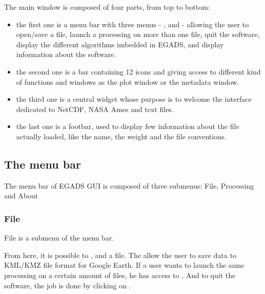 \documentclass[a4paper,10pt,openany,english]{sphinxmanual}
\let\sphinxpxdimen\pdfpxdimen\else\newdimen\sphinxpxdimen
\begin{document}
The main window is composed of four parts, from top to bottom:
\begin{itemize}
\item {} 
the first one is a menu bar with three menus - ,  and  - allowing the user to open/save a file, launch a processing on more than one file, quit the software, display the different algorithms imbedded in EGADS, and display information about the software.

\item {} 
the second one is a bar containing 12 icons and giving access to different kind of functions and windows as the plot window or the metadata window.

\item {} 
the third one is a central widget whose purpose is to welcome the interface dedicated to NetCDF, NASA Ames and text files.

\item {} 
the last one is a footbar, used to display few information about the file actually loaded, like the name, the weight and the file conventions.

\end{itemize}


\subsection{The menu bar}
\label{\detokenize{description:the-menu-bar}}
The menu bar of EGADS GUI is composed of three submenus: File, Processing and About


\subsubsection{File}
\label{\detokenize{description:file}}
File is a submenu of the menu bar.

\noindent{\hspace*{\fill}\scalebox{0.450000}{\sphinxincludegraphics[width=936\sphinxpxdimen,height=647\sphinxpxdimen]{{EGADS_GUI_002}.png}}\hspace*{\fill}}

From here, it is possible to ,  and  a file. The  allow the user to save data to KML/KMZ file format for Google Earth. If a user wants to launch the same processing on a certain amount of files, he has access to . And to quit the software, the job is done by clicking on .
\end{document}
